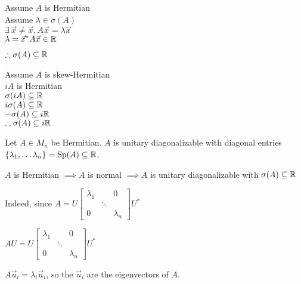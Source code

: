\documentclass[letterpaper,12pt,fleqn]{article}
\newcommand{\vx}{\vec{x}}
\newcommand{\vu}{\vec{u}}
\renewcommand{\o}{\sigma}
\renewcommand{\l}{\lambda}
\DeclareMathOperator{\Sp}{Sp}
\begin{document}
\begin{theproof}
  Assume $A$ is Hermitian \\
  Assume $\l\in\o(A)$ \\
  $\exists\,\vx\ne\vx,A\vx=\l\vx$ \\
  $\l=\vx^*A\vx\in\R$

  $\therefore\o(A)\subseteq\R$

  Assume $A$ is skew-Hermitian \\
  $iA$ is Hermitian \\
  $\o(iA)\subseteq\R$ \\
  $i\o(A)\subseteq\R$ \\
  $-\o(A)\subseteq i\R$ \\

  $\therefore\o(A)\subseteq i\R$
\end{theproof}
\newpage
\begin{theorem}
  Let $A\in M_n$ be Hermitian. $A$ is unitary diagonalizable with diagonal
  entries $\{\l_1,\ldots\l_n\}=\Sp(A)\subseteq\R$.
\end{theorem}

\begin{theproof}
  $A$ is Hermitian $\implies A$ is normal $\implies A$ is unitary
  diagonalizable with $\o(A)\subseteq\R$

  Indeed, since $A=U\begin{bmatrix}
  \l_1 & & 0 \\
  & \ddots & \\
  0 & & \l_n
  \end{bmatrix}U^*$

  $AU=U\begin{bmatrix}
  \l_1 & & 0 \\
  & \ddots & \\
  0 & & \l_n
  \end{bmatrix}U^*$

  $A\vu_i=\l_i\vu_i$, so the $\vu_i$ are the eigenvectors of $A$.
\end{theproof}
\end{document}
